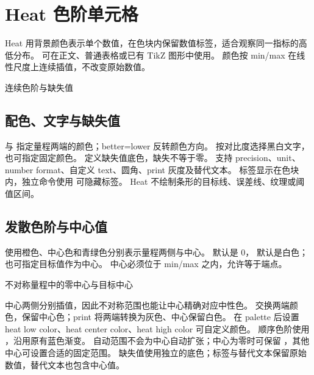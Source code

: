\section{Heat 色阶单元格}
\label{sec:heat}
Heat 用背景颜色表示单个数值，在色块内保留数值标签，适合观察同一指标的高低分布。
 可在正文、普通表格或已有 TikZ 图形中使用。
颜色按 min/max 在线性尺度上连续插值，不改变原始数值。
\begin{example}[text and listing,sidebyside=false]{连续色阶与缺失值}
\quad
{}\quad
{}\quad
{}
\end{example}
\subsection{配色、文字与缺失值}
 与  指定量程两端的颜色；better=lower 反转颜色方向。
 按对比度选择黑白文字，也可指定固定颜色。
 定义缺失值底色，缺失不等于零。
支持 precision、unit、number format、自定义 text、圆角、print 灰度及替代文本。
标签显示在色块内，独立命令使用  可隐藏标签。
Heat 不绘制条形的目标线、误差线、纹理或阈值区间。
\subsection{发散色阶与中心值}
 使用橙色、中心色和青绿色分别表示量程两侧与中心。
 默认是 0， 默认是白色；也可指定目标值作为中心。
中心必须位于 min/max 之内，允许等于端点。
\begin{example}[text and listing,sidebyside=false]{不对称量程中的零中心与目标中心}
\quad
{}\quad
{}

\quad
{}\quad
{}
\end{example}
中心两侧分别插值，因此不对称范围也能让中心精确对应中性色。
 交换两端颜色，保留中心色；print 将两端转换为灰色、中心保留白色。
在 palette 后设置 heat low color、heat center color、heat high color 可自定义颜色。
顺序色阶使用 ，沿用原有蓝色渐变。
自动范围不会为中心自动扩张；中心为零时可保留 ，其他中心可设置合适的固定范围。
缺失值使用独立的底色；标签与替代文本保留原始数值，替代文本也包含中心值。

